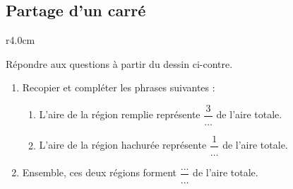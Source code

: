 
\subsection*{Partage d'un carré}

\begin{wrapfigure}[2]{r}{4.0cm}
   \vspace{-0.5cm}        %
   \centering
   
\end{wrapfigure}

Répondre aux questions à partir du dessin ci-contre.
\begin{enumerate}
    \item
        Recopier et compléter les phrases suivantes :
        \begin{enumerate}
            \item
                L'aire de la région remplie représente \( \dfrac{ 3 }{ \ldots }\) de l'aire totale.
            \item
                L'aire de la région hachurée représente \( \dfrac{ 1 }{ \ldots }\) de l'aire totale.
        \end{enumerate}
    \item
        Ensemble, ces deux régions forment \( \dfrac{ \ldots }{ \ldots }\) de l'aire totale.
\end{enumerate}
